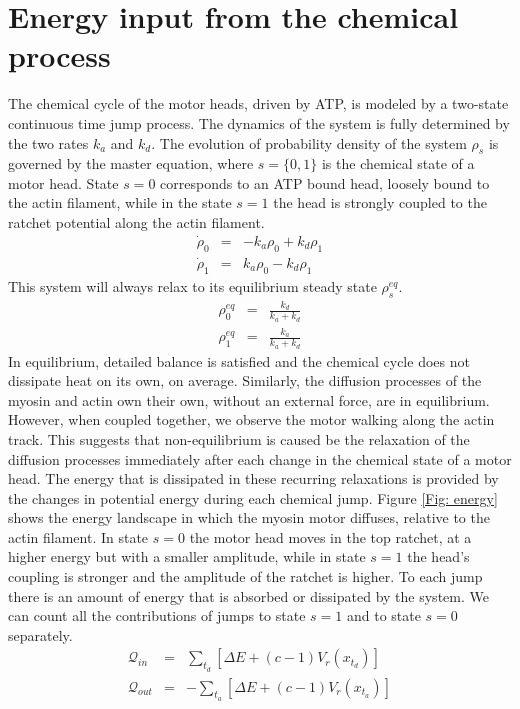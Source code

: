 \documentclass[aps,pre,onecolumn,showpacs,showkeys,a4paper]{revtex4}
\begin{document}
\section{Energy input from the chemical process}

The chemical cycle of the motor heads, driven by ATP, is modeled by a two-state continuous time jump process. 
The dynamics of the system is fully determined by the two rates $k_a$ and $k_d$. 
The evolution of probability density of the system $\rho_s$ is governed by the master equation, where $s = \{0,1\}$ is the chemical state of a motor head. 
State $s=0$ corresponds to an ATP bound head, loosely bound to the actin filament, while in the state $s=1$ the head is strongly coupled to the ratchet potential along the actin filament.
\begin{eqnarray}
\dot{\rho}_0 &=& -k_a \rho_0 + k_d \rho_1\\
\dot{\rho}_1 &=& k_a \rho_0 - k_d \rho_1 
\end{eqnarray}
This system will always relax to its equilibrium steady state $\rho^{eq}_s$.
\begin{eqnarray}
\rho^{eq}_0 &=& \frac{k_d}{k_a+k_d}\\
\rho^{eq}_1 &=& \frac{k_a}{k_a+k_d} 
\end{eqnarray}
In equilibrium, detailed balance is satisfied and the chemical cycle does not dissipate heat on its own, on average.
Similarly, the diffusion processes of the myosin and actin own their own, without an external force, are in equilibrium.
However, when coupled together, we observe the motor walking along the actin track. 
This suggests that non-equilibrium is caused be the relaxation of the diffusion processes immediately after each change in the chemical state of a motor head. 
The energy that is dissipated in these recurring relaxations is provided by the changes in potential energy during each chemical jump. 
Figure \ref{Fig: energy} shows the energy landscape in which the myosin motor diffuses, relative to the actin filament. 
In state $s=0$ the motor head moves in the top ratchet, at a higher energy but with a smaller amplitude, while in state $s=1$ the head's coupling is stronger and the amplitude of the ratchet is higher. 
To each jump there is an amount of energy that is absorbed or dissipated by the system. 
We can count all the contributions of jumps to state $s=1$ and to state $s=0$ separately.
\begin{eqnarray}
\mathcal Q_{in} &=& \sum_{t_d} \left[\Delta E + (c-1)V_r(x_{t_d})\right]\label{q_in}\\
\mathcal Q_{out} &=& -\sum_{t_a} \left[\Delta E + (c-1)V_r(x_{t_a})\right]\label{q_out}
\end{eqnarray}
\end{document}
